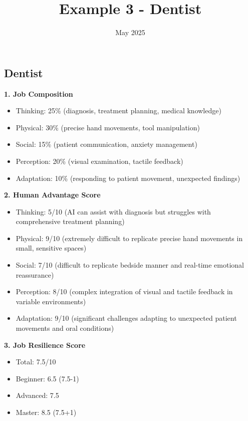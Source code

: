 \documentclass[
  11pt,
]{article}
\title{Example 3 - Dentist}
\author{}
\date{May 2025}
\providecommand{\tightlist}{%
  \setlength{\itemsep}{0pt}\setlength{\parskip}{0pt}}
\begin{document}
\maketitle

\subsection{Dentist}\label{dentist}

\textbf{1. Job Composition}

\begin{itemize}
\tightlist
\item
  Thinking: 25\% (diagnosis, treatment planning, medical knowledge)
\item
  Physical: 30\% (precise hand movements, tool manipulation)
\item
  Social: 15\% (patient communication, anxiety management)
\item
  Perception: 20\% (visual examination, tactile feedback)
\item
  Adaptation: 10\% (responding to patient movement, unexpected findings)
\end{itemize}

\textbf{2. Human Advantage Score}

\begin{itemize}
\tightlist
\item
  Thinking: 5/10 (AI can assist with diagnosis but struggles with
  comprehensive treatment planning)
\item
  Physical: 9/10 (extremely difficult to replicate precise hand
  movements in small, sensitive spaces)
\item
  Social: 7/10 (difficult to replicate bedside manner and real-time
  emotional reassurance)
\item
  Perception: 8/10 (complex integration of visual and tactile feedback
  in variable environments)
\item
  Adaptation: 9/10 (significant challenges adapting to unexpected
  patient movements and oral conditions)
\end{itemize}

\textbf{3. Job Resilience Score}

\begin{itemize}
\tightlist
\item
  Total: 7.5/10
\item
  Beginner: 6.5 (7.5-1)
\item
  Advanced: 7.5
\item
  Master: 8.5 (7.5+1)
\end{itemize}
\end{document}
